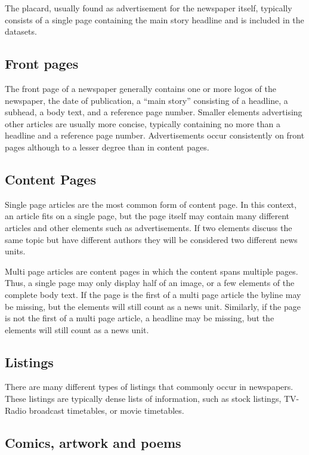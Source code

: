 \documentclass[english, bibtex]{kththesis}
\begin{document}
The placard, usually found as advertisement for the newspaper itself, typically consists of a single page containing the main story headline and is included in the datasets. 

\subsection{Front pages}

The front page of a newspaper generally contains one or more logos of the newspaper, the date of publication, a “main story” consisting of a headline, a subhead, a body text, and a reference page number. Smaller elements advertising other articles are usually more concise, typically containing no more than a headline and a reference page number. Advertisements occur consistently on front pages although to a lesser degree than in content pages. 

\subsection{Content Pages}

Single page articles are the most common form of content page. In this context, an article fits on a single page, but the page itself may contain many different articles and other elements such as advertisements. If two elements discuss the same topic but have different authors they will be considered two different news units.

Multi page articles are content pages in which the content spans multiple pages. Thus, a single page may only display half of an image, or a few elements of the complete body text. If the page is the first of a multi page article the byline may be missing, but the elements will still count as a news unit. Similarly, if the page is not the first of a multi page article, a headline may be missing, but the elements will still count as a news unit.

\subsection{Listings}

There are many different types of listings that commonly occur in newspapers. These listings are typically dense lists of information, such as stock listings, TV-Radio broadcast timetables, or movie timetables.

\subsection{Comics, artwork and poems}
\end{document}
